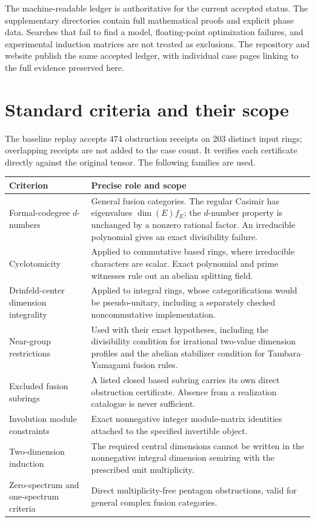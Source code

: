 \documentclass[11pt]{article}
\theoremstyle{remark}\newtheorem{remark}[proposition]{Remark}
\begin{document}
The machine-readable ledger is authoritative for the current accepted status.
The supplementary directories contain full mathematical proofs and explicit
phase data. Searches that fail to find a model, floating-point optimization
failures, and experimental induction matrices are not treated as exclusions.
The repository and website publish the same accepted ledger, with individual
case pages linking to the full evidence preserved here.

\section{Standard criteria and their scope}
The baseline replay accepts 474 obstruction receipts on 203 distinct input
rings; overlapping receipts are not added to the case count. It verifies each
certificate directly against the original tensor. The following families
are used.
{\small
\begin{longtable}{p{}p{}}
\toprule Criterion & Precise role and scope \\\midrule\endhead
Formal-codegree $d$-numbers & General fusion categories. The regular Casimir
has eigenvalues $\dim(E)f_E$; the $d$-number property is unchanged by a nonzero
rational factor. An irreducible polynomial gives an exact divisibility
failure. \\
Cyclotomicity & Applied to commutative based rings, where irreducible
characters are scalar. Exact polynomial and prime witnesses rule out an
abelian splitting field. \\
Drinfeld-center dimension integrality & Applied to integral rings, whose
categorifications would be pseudo-unitary, including a separately checked
noncommutative implementation. \\
Near-group restrictions & Used with their exact
hypotheses, including the divisibility condition for irrational two-value
dimension profiles and the abelian stabilizer condition for
Tambara--Yamagami fusion rules. \\
Excluded fusion subrings & A listed closed based subring carries its own
direct obstruction certificate. Absence from a realization catalogue is
never sufficient. \\
Involution module constraints & Exact nonnegative integer module-matrix
identities attached to the specified invertible object. \\
Two-dimension induction & The required central dimensions cannot be written
in the nonnegative integral dimension semiring with the prescribed unit
multiplicity. \\
Zero-spectrum and one-spectrum criteria & Direct multiplicity-free
pentagon obstructions, valid for general complex fusion categories. \\
\bottomrule
\end{longtable}
}
\end{document}
